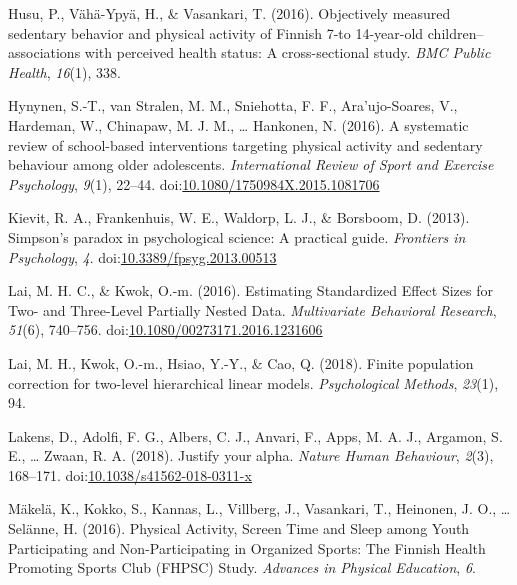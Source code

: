 \documentclass[english,floatsintext,]{apa6}
\theoremstyle{definition}
\theoremstyle{definition}
\theoremstyle{definition}
\theoremstyle{remark}
\begin{document}
\hypertarget{ref-husuObjectivelyMeasuredSedentary2016}{}
Husu, P., Vähä-Ypyä, H., \& Vasankari, T. (2016). Objectively measured
sedentary behavior and physical activity of Finnish 7-to 14-year-old
children--associations with perceived health status: A cross-sectional
study. \emph{BMC Public Health}, \emph{16}(1), 338.

\hypertarget{ref-hynynenSystematicReviewSchoolbased2016}{}
Hynynen, S.-T., van Stralen, M. M., Sniehotta, F. F., Ara\a'ujo-Soares,
V., Hardeman, W., Chinapaw, M. J. M., \ldots{} Hankonen, N. (2016). A
systematic review of school-based interventions targeting physical
activity and sedentary behaviour among older adolescents.
\emph{International Review of Sport and Exercise Psychology},
\emph{9}(1), 22--44.
doi:\href{https://doi.org/10.1080/1750984X.2015.1081706}{10.1080/1750984X.2015.1081706}

\hypertarget{ref-kievitSimpsonParadoxPsychological2013}{}
Kievit, R. A., Frankenhuis, W. E., Waldorp, L. J., \& Borsboom, D.
(2013). Simpson's paradox in psychological science: A practical guide.
\emph{Frontiers in Psychology}, \emph{4}.
doi:\href{https://doi.org/10.3389/fpsyg.2013.00513}{10.3389/fpsyg.2013.00513}

\hypertarget{ref-laiEstimatingStandardizedEffect2016}{}
Lai, M. H. C., \& Kwok, O.-m. (2016). Estimating Standardized Effect
Sizes for Two- and Three-Level Partially Nested Data. \emph{Multivariate
Behavioral Research}, \emph{51}(6), 740--756.
doi:\href{https://doi.org/10.1080/00273171.2016.1231606}{10.1080/00273171.2016.1231606}

\hypertarget{ref-laiFinitePopulationCorrection2018}{}
Lai, M. H., Kwok, O.-m., Hsiao, Y.-Y., \& Cao, Q. (2018). Finite
population correction for two-level hierarchical linear models.
\emph{Psychological Methods}, \emph{23}(1), 94.

\hypertarget{ref-lakensJustifyYourAlpha2018}{}
Lakens, D., Adolfi, F. G., Albers, C. J., Anvari, F., Apps, M. A. J.,
Argamon, S. E., \ldots{} Zwaan, R. A. (2018). Justify your alpha.
\emph{Nature Human Behaviour}, \emph{2}(3), 168--171.
doi:\href{https://doi.org/10.1038/s41562-018-0311-x}{10.1038/s41562-018-0311-x}

\hypertarget{ref-makelaPhysicalActivityScreen2016}{}
Mäkelä, K., Kokko, S., Kannas, L., Villberg, J., Vasankari, T.,
Heinonen, J. O., \ldots{} Selänne, H. (2016). Physical Activity, Screen
Time and Sleep among Youth Participating and Non-Participating in
Organized Sports: The Finnish Health Promoting Sports Club (FHPSC)
Study. \emph{Advances in Physical Education}, \emph{6}.
\end{document}
